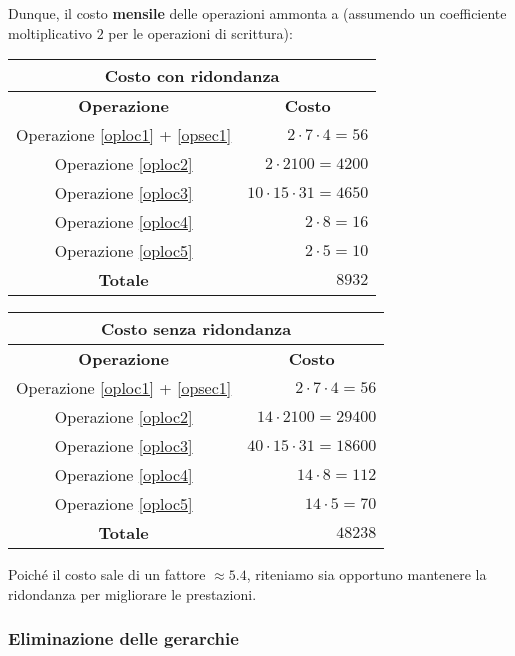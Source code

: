 \documentclass[a4paper,11pt]{article}
\begin{document}
\newline
Dunque, il costo \textbf{mensile} delle operazioni ammonta a (assumendo un
coefficiente moltiplicativo $2$ per le operazioni di scrittura):
\begin{center}
\begin{tabular}{ |c | r| }
  \hline
  \multicolumn{2}{|c|}{\textbf{Costo con ridondanza}} \\
  \hline
  \textbf{Operazione} & \multicolumn{1}{c|}{\textbf{Costo}} \\
  \hline
  Operazione \ref{oploc1} + \ref{opsec1} & $2 \cdot 7 \cdot 4 = 56$ \\
  \hline
  Operazione \ref{oploc2} & $2 \cdot 2 100 = 4 200$ \\
  \hline
  Operazione \ref{oploc3} & $10 \cdot 15 \cdot 31 = 4 650$ \\
  \hline
  Operazione \ref{oploc4} & $2 \cdot 8 = 16$ \\
  \hline
  Operazione \ref{oploc5} & $2 \cdot 5 = 10$ \\
  \hline
  \textbf{Totale} & $8 932$ \\
  \hline
\end{tabular}
\end{center}
\begin{center}
\begin{tabular}{ |c | r| }
  \hline
  \multicolumn{2}{|c|}{\textbf{Costo senza ridondanza}} \\
  \hline
  \textbf{Operazione} & \multicolumn{1}{c|}{\textbf{Costo}} \\
  \hline
  Operazione \ref{oploc1} + \ref{opsec1} & $2 \cdot 7 \cdot 4 = 56$ \\
  \hline
  Operazione \ref{oploc2} & $14 \cdot 2 100 = 29 400$ \\
  \hline
  Operazione \ref{oploc3} & $40 \cdot 15 \cdot 31 = 18 600$ \\
  \hline
  Operazione \ref{oploc4} & $14 \cdot 8 = 112$ \\
  \hline
  Operazione \ref{oploc5} & $14 \cdot 5 = 70$ \\
  \hline
  \textbf{Totale} & $48 238$ \\
  \hline
\end{tabular}
\end{center}

Poiché il costo sale di un fattore $\approx5.4$, riteniamo sia opportuno mantenere la ridondanza per migliorare le prestazioni.

\subsubsection*{Eliminazione delle gerarchie}
\end{document}

